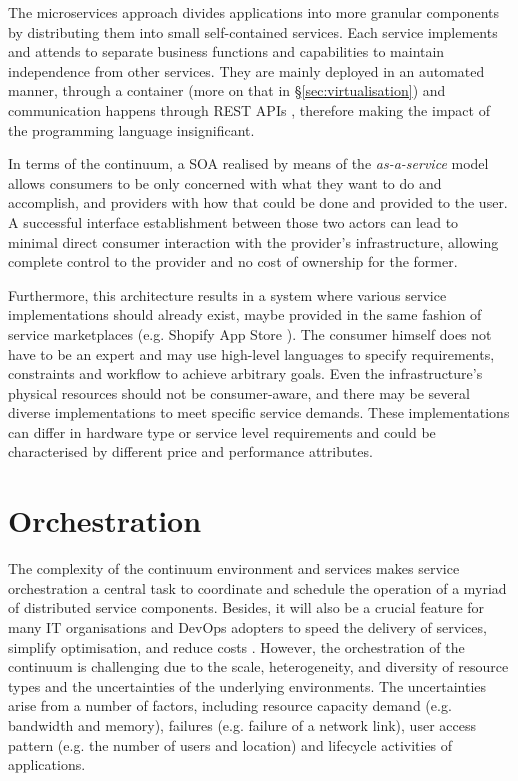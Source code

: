 The microservices approach divides applications into more granular components by distributing them into small self-contained services. Each service implements and attends to separate business functions and capabilities to maintain independence from other services. They are mainly deployed in an automated manner, through a container (more on that in §\ref{sec:virtualisation}) and communication happens through REST APIs \cite{rest}, therefore making the impact of the programming language insignificant.

In terms of the continuum, a SOA realised by means of the \emph{as-a-service} model allows consumers to be only concerned with what they want to do and accomplish, and providers with how that could be done and provided to the user. A successful interface establishment between those two actors can lead to minimal direct consumer interaction with the provider's infrastructure, allowing complete control to the provider and no cost of ownership for the former.

Furthermore, this architecture results in a system where various service implementations should already exist, maybe provided in the same fashion of service marketplaces (e.g. Shopify App Store \cite{shopify}). The consumer himself does not have to be an expert and may use high-level languages to specify requirements, constraints and workflow to achieve arbitrary goals. Even the infrastructure's physical resources should not be consumer-aware, and there may be several diverse implementations to meet specific service demands. These implementations can differ in hardware type or service level requirements and could be characterised by different price and performance attributes.

\section{Orchestration}

The complexity of the continuum environment and services makes service orchestration a central task to coordinate and schedule the operation of a myriad of distributed service components. Besides, it will also be a crucial feature for many IT organisations and DevOps adopters to speed the delivery of services, simplify optimisation, and reduce costs \cite{akamai}. However, the orchestration of the continuum is challenging due to the scale, heterogeneity, and diversity of resource types and the uncertainties of the underlying environments. The uncertainties arise from a number of factors, including resource capacity demand (e.g. bandwidth and memory), failures (e.g. failure of a network link), user access pattern (e.g. the number of users and location) and lifecycle activities of applications.

